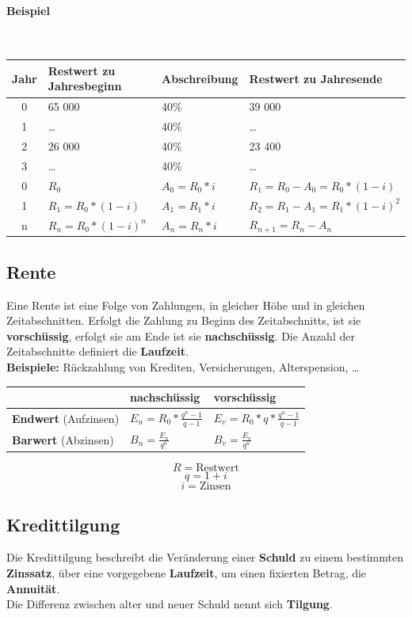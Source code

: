 \documentclass{school}
\begin{document}
\paragraph{Beispiel} ~\\
\begin{tabular}{c l l l}
\textbf{Jahr} & \textbf{Restwert zu Jahresbeginn} & \textbf{Abschreibung} & \textbf{Restwert zu Jahresende}\\
\midrule
0 & 65 000 & 40\% & 39 000\\
1 & \dots & 40\% & \dots \\
2 & 26 000 & 40\% & 23 400\\
3 & \dots & 40\% & \dots \\
\midrule
0 & $R_0$ & $A_0 = R_0 * i$ & $R_1 = R_0 - A_0 = R_0 * (1-i)$\\
1 & $R_1 = R_0 * (1-i)$ & $A_1 = R_1 * i$ & $R_2 = R_1 - A_1 = R_1 * {(1-i)}^2$\\
n & $R_n = R_0 * (1-i)^n$& $A_n = R_n * i$ & $R_{n + 1} = R_{n} - A_{n}$\\
\end{tabular}

\subsection{Rente}
Eine Rente ist eine Folge von Zahlungen, in gleicher Höhe und in gleichen Zeitabschnitten.
Erfolgt die Zahlung zu Beginn des Zeitabschnitts, ist sie \textbf{vorsch\"ussig}, erfolgt sie am Ende ist sie \textbf{nachsch\"ussig}.
Die Anzahl der Zeitabschnitte definiert die \textbf{Laufzeit}.
\vspace{1 em}\\
\textbf{Beispiele: } R\"uckzahlung von Krediten, Versicherungen, Alterspension, \dots

\begin{center}
    \begin{tabular}{l | l l}
    & \textbf{nachsch\"ussig} & \textbf{vorsch\"ussig}\\
    \hline
    \textbf{Endwert} (Aufzinsen) & $E_n = R_0*\frac{q^n - 1}{q - 1}$ & $E_v = R_0*q*\frac{q^n - 1}{q - 1}$\\
    \textbf{Barwert} (Abzinsen) & $B_n = \frac{E_n}{q^n}$ & $B_v = \frac{E_v}{q^n}$
    \end{tabular}
\end{center}
$$R = \text{Restwert}$$
$$q = 1 + i$$
$$i = \text{Zinsen}$$

\newpage
\subsection{Kredittilgung}
Die Kredittilgung beschreibt die Ver\"anderung einer \textbf{Schuld} zu einem bestimmten \textbf{Zinssatz}, über eine vorgegebene \textbf{Laufzeit}, um einen fixierten Betrag, die \textbf{Annuität}.
\\Die Differenz zwischen alter und neuer Schuld nennt sich \textbf{Tilgung}.
\end{document}
